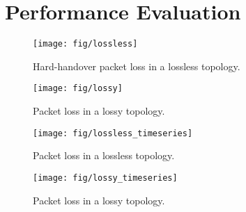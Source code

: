 \section{Performance Evaluation} \label{eval}

\begin{figure}[h]
\centerline{\texttt{[image: fig/lossless]}}
\caption{Hard-handover packet loss in a lossless topology.}
\label{fig:lossless}
\end{figure}

\begin{figure}[h]
\centerline{\texttt{[image: fig/lossy]}}
\caption{Packet loss in a lossy topology.}
\label{fig:lossy}
\end{figure}

\begin{figure}[h]
\centerline{\texttt{[image: fig/lossless\_timeseries]}}
\caption{Packet loss in a lossless topology.}
\label{fig:lossless_ts}
\end{figure}

\begin{figure}[h]
\centerline{\texttt{[image: fig/lossy\_timeseries]}}
\caption{Packet loss in a lossy topology.}
\label{fig:lossy_ts}
\end{figure}

